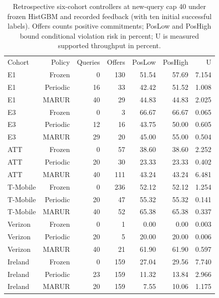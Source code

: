 \begin{table}[!ht]
\centering\small
\caption{Retrospective six-cohort controllers at new-query cap 40 under frozen HistGBM and recorded feedback (with ten initial successful labels). Offers counts positive commitments; PosLow and PosHigh bound conditional violation risk in percent; U is measured supported throughput in percent.}
\begin{tabular}{lrrrrrr}
\hline
Cohort & Policy & Queries & Offers & PosLow & PosHigh & U \\
E1 & Frozen & 0 & 130 & 51.54 & 57.69 & 7.154 \\
E1 & Periodic & 16 & 33 & 42.42 & 51.52 & 1.008 \\
E1 & MARUR & 40 & 29 & 44.83 & 44.83 & 2.025 \\
E3 & Frozen & 0 & 3 & 66.67 & 66.67 & 0.065 \\
E3 & Periodic & 12 & 16 & 43.75 & 50.00 & 0.605 \\
E3 & MARUR & 29 & 20 & 45.00 & 55.00 & 0.504 \\
ATT & Frozen & 0 & 57 & 38.60 & 38.60 & 2.252 \\
ATT & Periodic & 20 & 30 & 23.33 & 23.33 & 0.402 \\
ATT & MARUR & 40 & 111 & 43.24 & 43.24 & 6.481 \\
T-Mobile & Frozen & 0 & 236 & 52.12 & 52.12 & 1.254 \\
T-Mobile & Periodic & 20 & 47 & 55.32 & 55.32 & 0.141 \\
T-Mobile & MARUR & 40 & 52 & 65.38 & 65.38 & 0.337 \\
Verizon & Frozen & 0 & 1 & 0.00 & 0.00 & 0.003 \\
Verizon & Periodic & 20 & 5 & 20.00 & 20.00 & 0.006 \\
Verizon & MARUR & 40 & 21 & 61.90 & 61.90 & 0.597 \\
Ireland & Frozen & 0 & 159 & 27.04 & 29.56 & 7.740 \\
Ireland & Periodic & 23 & 159 & 11.32 & 13.84 & 2.966 \\
Ireland & MARUR & 20 & 159 & 7.55 & 10.06 & 1.175 \\
\hline
\end{tabular}
\end{table}

